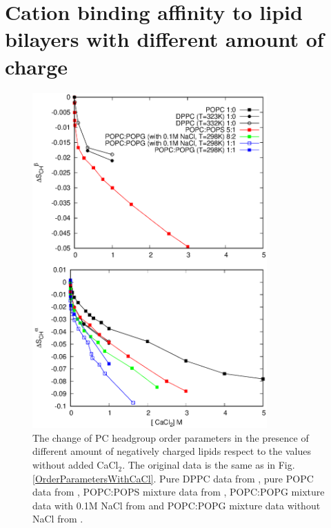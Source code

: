 \documentclass[aps,prl,superscriptaddress,twocolumn]{revtex4}
\begin{document}
\section{Cation binding affinity to lipid bilayers with different amount of charge}

\begin{figure}[]
  \centering
  \includegraphics[width=9.0cm]{../Figs/CHANGESwithCaCl.eps}
  \caption{\label{OrderParameterCHANGESWithCaClBELOW1M}
    The change of PC headgroup order parameters
    in the presence of different amount of negatively charged lipids
    respect to the values without added CaCl$_2$.
    The original data is the same as in Fig. \ref{OrderParametersWithCaCl}. 
    Pure DPPC data from \cite{akutsu81}, pure POPC data from \cite{altenbach84}, 
    POPC:POPS mixture data from \cite{roux90}, POPC:POPG mixture data with 0.1M NaCl from \cite{macdonald87}
    and POPC:POPG mixture data without NaCl from \cite{borle85}.
  }
\end{figure}
\end{document}
